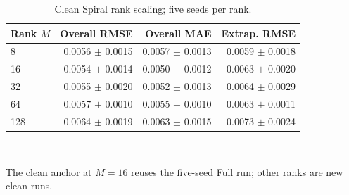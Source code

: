\begin{table}[t]
\centering
\small
\caption{Clean Spiral rank scaling; five seeds per rank.}
\label{tab:rebuttal-rank}
\begin{tabular}{lrrr}
\toprule
Rank $M$ & Overall RMSE & Overall MAE & Extrap. RMSE \\
\midrule
8 & 0.0056 $\pm$ 0.0015 & 0.0057 $\pm$ 0.0013 & 0.0059 $\pm$ 0.0018 \\
16 & 0.0054 $\pm$ 0.0014 & 0.0050 $\pm$ 0.0012 & 0.0063 $\pm$ 0.0020 \\
32 & 0.0055 $\pm$ 0.0020 & 0.0052 $\pm$ 0.0013 & 0.0064 $\pm$ 0.0029 \\
64 & 0.0057 $\pm$ 0.0010 & 0.0055 $\pm$ 0.0010 & 0.0063 $\pm$ 0.0011 \\
128 & 0.0064 $\pm$ 0.0019 & 0.0063 $\pm$ 0.0015 & 0.0073 $\pm$ 0.0024 \\
\bottomrule
\end{tabular}
\\[-1mm]
\begin{minipage}{0.96\linewidth}\footnotesize The clean anchor at $M=16$ reuses the five-seed Full run; other ranks are new clean runs.\end{minipage}
\end{table}

